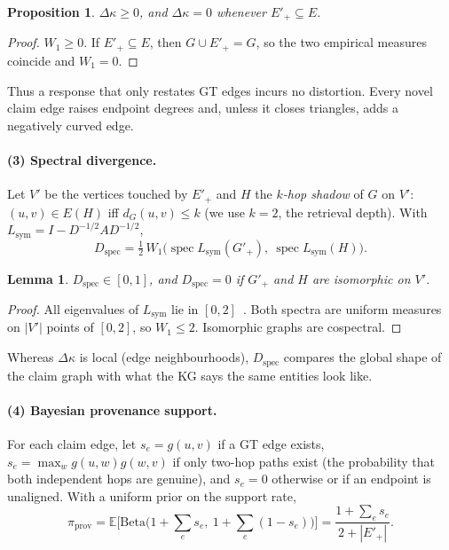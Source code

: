 \documentclass[10pt,twocolumn]{article}
\newtheorem{proposition}{Proposition}
\newtheorem{lemma}{Lemma}
\theoremstyle{remark}
\DeclareMathOperator{\spec}{spec}
\newcommand{\E}{\mathbb{E}}
\begin{document}
\begin{proposition}\label{prop:curv}
$\Delta\kappa\ge0$, and $\Delta\kappa=0$ whenever $E'_+\subseteq E$.
\end{proposition}
\begin{proof}
$W_1\ge0$. If $E'_+\subseteq E$, then $G\cup E'_+=G$, so the two empirical measures coincide and $W_1=0$.
\end{proof}
Thus a response that only restates GT edges incurs no distortion. Every novel claim edge raises endpoint degrees
and, unless it closes triangles, adds a negatively curved edge.

\paragraph{(3) Spectral divergence.}
Let $V'$ be the vertices touched by $E'_+$ and $H$ the \emph{$k$-hop shadow} of $G$ on $V'$: $(u,v)\in E(H)$ iff
$d_G(u,v)\le k$ (we use $k=2$, the retrieval depth). With
$L_{\mathrm{sym}}=I-D^{-1/2}AD^{-1/2}$,
\begin{equation}
D_{\mathrm{spec}}=\tfrac12\,W_1\big(\spec L_{\mathrm{sym}}(G'_+),\ \spec L_{\mathrm{sym}}(H)\big).
\end{equation}
\begin{lemma}\label{lem:spec}
$D_{\mathrm{spec}}\in[0,1]$, and $D_{\mathrm{spec}}=0$ if $G'_+$ and $H$ are isomorphic on $V'$.
\end{lemma}
\begin{proof}
All eigenvalues of $L_{\mathrm{sym}}$ lie in $[0,2]$~\cite{chung1997spectral}. Both spectra are uniform measures on
$|V'|$ points of $[0,2]$, so $W_1\le2$. Isomorphic graphs are cospectral.
\end{proof}
Whereas $\Delta\kappa$ is local (edge neighbourhoods), $D_{\mathrm{spec}}$ compares the global shape of the claim
graph with what the KG says the same entities look like.

\paragraph{(4) Bayesian provenance support.}
For each claim edge, let $s_e=g(u,v)$ if a GT edge exists, $s_e=\max_w g(u,w)g(w,v)$ if only two-hop paths exist (the
probability that both independent hops are genuine), and $s_e=0$ otherwise or if an endpoint is unaligned. With a
uniform prior on the support rate,
\begin{equation}
\pi_{\mathrm{prov}}=\E\big[\mathrm{Beta}\big(1+\textstyle\sum_e s_e,\ 1+\sum_e(1-s_e)\big)\big]=\frac{1+\sum_e s_e}{2+|E'_+|}.
\end{equation}
\end{document}

